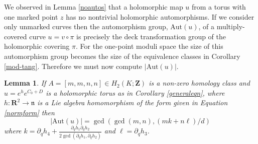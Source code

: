 \documentclass[11pt]{amsart}
\newcommand{\RR}{\mathbf{R}}
\newcommand{\ZZ}{\mathbf{Z}}
\newcommand{\Aut}{\mathrm{Aut}}
\newcommand{\nn}{\mathfrak{n}}
\numberwithin{equation}{section}
\newtheorem{lma}[equation]{Lemma}
\theoremstyle{definition}
\theoremstyle{remark}
\begin{document}
We observed in Lemma \ref{noautos} that a holomorphic map $u$ from a torus with one marked point $z$ has no nontrivial holomorphic automorphisms. If we consider only unmarked curves then the automorphism group, $\Aut(u)$, of a multiply-covered curve $u=v\circ\pi$ is precisely the deck transformation group of the holomorphic covering $\pi$. For the one-point moduli space the size of this automorphism group becomes the size of the equivalence classes in Corollary \ref{mod-tang}. Therefore we must now compute $|\Aut(u)|$.

\begin{lma}\label{autosize}
If $A=[m,m,n,n]\in H_2(K;\ZZ)$ is a non-zero homology class and $u=e^he^{C_0+D}$ is a holomorphic torus as in Corollary \ref{generaleqn}, where $h\colon\RR^2\to\nn$ is a Lie algebra homomorphism of the form given in Equation \eqref{normform} then
\[|\Aut(u)|=\gcd(\gcd(m,n),(mk+n\ell)/d)\]
where $k=\partial_qh_4+\frac{\partial_qh_1\partial_qh_2}{2\gcd(\partial_qh_1,\partial_qh_2)}$ and $\ell=\partial_qh_3$.
\end{lma}
\end{document}
